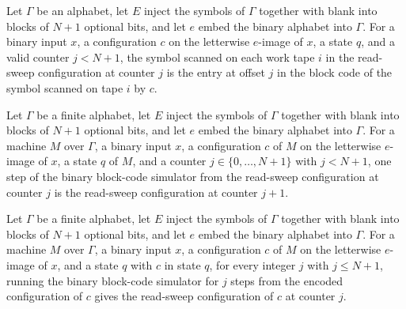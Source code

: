 \begin{lemma}
\label{Turing.FinTM.arReadCfg_symbols}
\leanok
{}
Let $\Gamma$ be an alphabet, let $E$ inject the symbols of $\Gamma$ together with blank
into blocks of $N+1$ optional bits, and let $e$ embed the binary alphabet into $\Gamma$.
For a binary input $x$, a configuration $c$ on the letterwise $e$-image of $x$, a state
$q$, and a valid counter $j<N+1$, the symbol scanned on each work tape $i$ in the
read-sweep configuration at counter $j$ is the entry at offset $j$ in the block code of
the symbol scanned on tape $i$ by $c$.
\end{lemma}

\begin{lemma}
\label{Turing.FinTM.arReadCfg_step}
\leanok
{}
Let $\Gamma$ be a finite alphabet, let $E$ inject the symbols of $\Gamma$ together with
blank into blocks of $N+1$ optional bits, and let $e$ embed the binary alphabet into
$\Gamma$. For a machine $M$ over $\Gamma$, a binary input $x$, a configuration $c$ of
$M$ on the letterwise $e$-image of $x$, a state $q$ of $M$, and a counter
$j\in\{0,\ldots,N+1\}$ with $j<N+1$, one step of the binary block-code simulator from
the read-sweep configuration at counter $j$ is the read-sweep configuration at counter
$j+1$.
\end{lemma}

\begin{lemma}
\label{Turing.FinTM.arReadCfg_run}
\leanok
{}
Let $\Gamma$ be a finite alphabet, let $E$ inject the symbols of $\Gamma$ together with
blank into blocks of $N+1$ optional bits, and let $e$ embed the binary alphabet into
$\Gamma$. For a machine $M$ over $\Gamma$, a binary input $x$, a configuration $c$ of
$M$ on the letterwise $e$-image of $x$, and a state $q$ with $c$ in state $q$, for every
integer $j$ with $j\le N+1$, running the binary block-code simulator for $j$ steps from
the encoded configuration of $c$ gives the read-sweep configuration of $c$ at counter
$j$.
\end{lemma}

